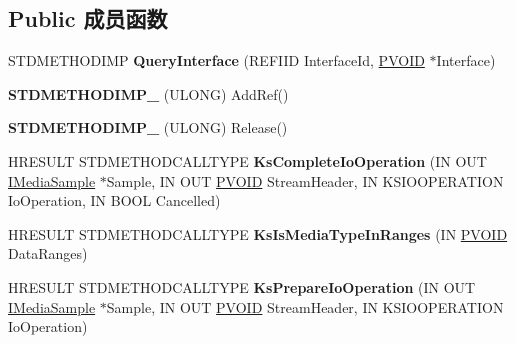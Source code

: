 \subsection*{Public 成员函数}
\begin{DoxyCompactItemize}
\item 
\mbox{\label{class_c_ks_data_type_handler_a5dd92221651ce2d3abe14df238f640d7}} 
S\+T\+D\+M\+E\+T\+H\+O\+D\+I\+MP {\bfseries Query\+Interface} (R\+E\+F\+I\+ID Interface\+Id, \hyperlink{interfacevoid}{P\+V\+O\+ID} $\ast$Interface)
\item 
\mbox{\label{class_c_ks_data_type_handler_a6c0af8ca5946c2ae6e86f42c7cd72cf7}} 
{\bfseries S\+T\+D\+M\+E\+T\+H\+O\+D\+I\+M\+P\+\_\+} (U\+L\+O\+NG) Add\+Ref()
\item 
\mbox{\label{class_c_ks_data_type_handler_a20e49865d43411ef109fe4e20b0997f9}} 
{\bfseries S\+T\+D\+M\+E\+T\+H\+O\+D\+I\+M\+P\+\_\+} (U\+L\+O\+NG) Release()
\item 
\mbox{\label{class_c_ks_data_type_handler_abe0c939f4fbe9315dac9c87395f0ba32}} 
H\+R\+E\+S\+U\+LT S\+T\+D\+M\+E\+T\+H\+O\+D\+C\+A\+L\+L\+T\+Y\+PE {\bfseries Ks\+Complete\+Io\+Operation} (IN O\+UT \hyperlink{interface_i_media_sample}{I\+Media\+Sample} $\ast$Sample, IN O\+UT \hyperlink{interfacevoid}{P\+V\+O\+ID} Stream\+Header, IN K\+S\+I\+O\+O\+P\+E\+R\+A\+T\+I\+ON Io\+Operation, IN B\+O\+OL Cancelled)
\item 
\mbox{\label{class_c_ks_data_type_handler_a3cfbe3d079b9f50589bb4700fd08493d}} 
H\+R\+E\+S\+U\+LT S\+T\+D\+M\+E\+T\+H\+O\+D\+C\+A\+L\+L\+T\+Y\+PE {\bfseries Ks\+Is\+Media\+Type\+In\+Ranges} (IN \hyperlink{interfacevoid}{P\+V\+O\+ID} Data\+Ranges)
\item 
\mbox{\label{class_c_ks_data_type_handler_a4e620ea6397945dcfd34f3ffb6bc06d1}} 
H\+R\+E\+S\+U\+LT S\+T\+D\+M\+E\+T\+H\+O\+D\+C\+A\+L\+L\+T\+Y\+PE {\bfseries Ks\+Prepare\+Io\+Operation} (IN O\+UT \hyperlink{interface_i_media_sample}{I\+Media\+Sample} $\ast$Sample, IN O\+UT \hyperlink{interfacevoid}{P\+V\+O\+ID} Stream\+Header, IN K\+S\+I\+O\+O\+P\+E\+R\+A\+T\+I\+ON Io\+Operation)
\item 

\end{DoxyCompactItemize}
